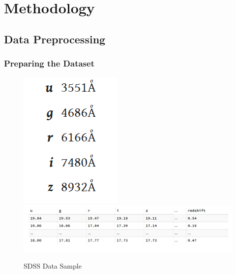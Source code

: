 \documentclass{beamer}
\begin{document}
\section{Methodology}
\subsection{Data Preprocessing}
\begin{frame}
	\frametitle{Preparing the Dataset}
    \begin{figure}
        \includegraphics[scale=0.5]{img/wavelengths.png}
        \includegraphics[scale=0.3]{img/sdss_data.png}
        \caption*{SDSS Data Sample}
    \end{figure}
    \end{frame}
\end{document}
